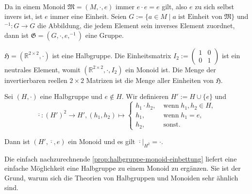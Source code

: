 \begin{remark}
    Da in einem Monoid $\mathfrak{M} = (M, \cdot, e)$ immer $e \cdot e = e$ gilt, also $e$ zu sich selbst invers ist, ist $e$ immer eine Einheit. Seien $G := \{a \in M \mid a \;\text{ist Einheit von}\; \mathfrak{M}\}$ und $^{-1}: G \to G$ die Abbildung, die jedem Element sein inverses Element zuordnet, dann ist $\mathfrak{G} = (G, \cdot, e, ^{-1})$ eine Gruppe.
\end{remark}

\begin{example}
    $\mathfrak{H} = (\mathbb{R}^{2\times 2}, \cdot)$ ist eine Halbgruppe. Die Einheitsmatrix $I_2 := \left(\begin{matrix}
        1 & 0 \\ 0 & 1
    \end{matrix}\right)$ ist ein neutrales Element, womit $(\mathbb{R}^{2\times 2}, \cdot, I_2)$ ein Monoid ist. Die Menge der invertierbaren reellen $2 \times 2$ Matrizen ist die Menge aller Einheiten von $\mathfrak{H}$.
\end{example}

\begin{proposition}\label{prop:halbgruppe-monoid-einbettung}
    Sei $(H, \cdot)$ eine Halbgruppe und $e \not\in H$. Wir definieren $H' := H \cup \{e\}$ und $$\overline{\cdot}: (H')^2 \to H', (h_1, h_2) \mapsto \left\{\begin{array}{ll}
        h_1 \cdot h_2, & \;\text{wenn}\; h_1, h_2 \in H, \\
        h_1, & \;\text{wenn}\; h_1 = e, \\
        h_2, & \;\text{sonst}.
    \end{array}\right.$$

    Dann ist $(H', \overline{\cdot}, e)$ ein Monoid und es gilt $\overline{\cdot}\vert_{H^2} = \cdot$.
\end{proposition}

\begin{remark}
    Die einfach nachzurechnende \cref{prop:halbgruppe-monoid-einbettung} liefert eine einfache Möglichkeit eine Halbgruppe zu einem Monoid zu ergänzen. Sie ist der Grund, warum sich die Theorien von Halbgruppen und Monoiden sehr ähnlich sind.
\end{remark}

